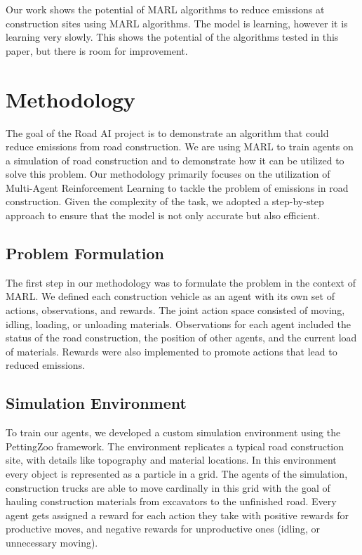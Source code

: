 \documentclass[conference]{IEEEtran}
\begin{document}
Our work shows the potential of MARL algorithms to reduce emissions at construction sites using MARL
algorithms. The model is learning, however it is learning very slowly. This shows the potential of
the algorithms tested in this paper, but there is room for improvement.


\section{Methodology}

The goal of the Road AI project is to demonstrate an algorithm that could reduce emissions from road construction.
We are using MARL to train agents on a simulation of road construction and to demonstrate how it can be utilized to solve this problem.
Our methodology primarily focuses on the utilization of Multi-Agent Reinforcement Learning to tackle the problem of emissions in road construction. Given the complexity of the task, we adopted a step-by-step approach to ensure that the model is not only accurate but also efficient.

\subsection{Problem Formulation}
The first step in our methodology was to formulate the problem in the context of MARL. We defined each construction vehicle as an agent with its own set of actions, observations, and rewards. The joint action space consisted of moving, idling, loading, or unloading materials. Observations for each agent included the status of the road construction, the position of other agents, and the current load of materials. Rewards were also implemented to promote actions that lead to reduced emissions.

\subsection{Simulation Environment}
To train our agents, we developed a custom simulation environment using the PettingZoo framework. The environment replicates a typical road construction site, with details like topography and material locations. In this environment every object is represented as a particle in a grid.
The agents of the simulation, construction trucks are able to move cardinally in this grid with the goal of hauling construction materials from excavators to the unfinished road.
Every agent gets assigned a reward for each action they take with positive rewards for productive moves, and negative rewards for unproductive ones (idling, or unnecessary moving).
\end{document}
